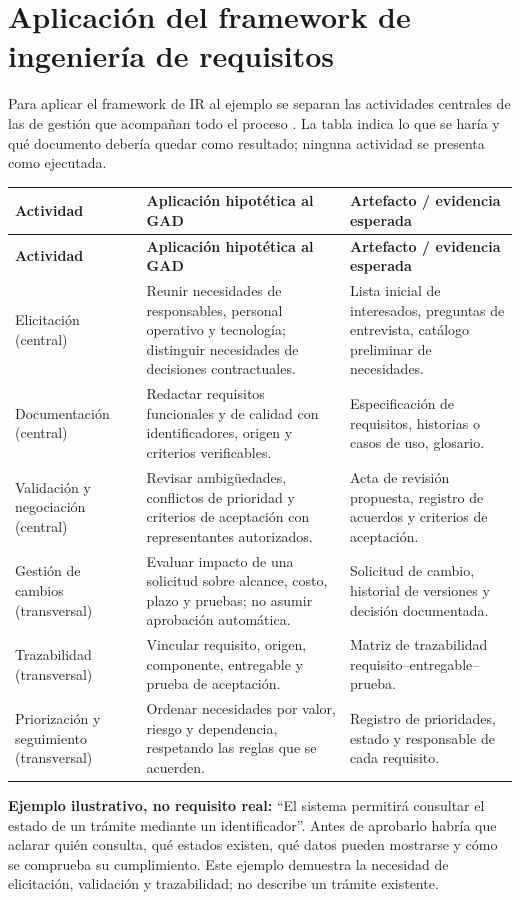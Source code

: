 \documentclass[10pt,a4paper,onecolumn]{IEEEtran}
\begin{document}
\section{Aplicación del framework de ingeniería de requisitos}
Para aplicar el framework de IR al ejemplo se separan las actividades centrales de las de gestión que acompañan todo el proceso \cite{ireb2026}. La tabla indica lo que se haría y qué documento debería quedar como resultado; ninguna actividad se presenta como ejecutada.
\small
\begin{longtable}{@{}p{3.0cm}p{6.25cm}p{5.65cm}@{}}
\toprule
\textbf{Actividad} & \textbf{Aplicación hipotética al GAD} & \textbf{Artefacto / evidencia esperada}\\
\midrule\endfirsthead
\toprule
\textbf{Actividad} & \textbf{Aplicación hipotética al GAD} & \textbf{Artefacto / evidencia esperada}\\
\midrule\endhead
Elicitación (central) & Reunir necesidades de responsables, personal operativo y tecnología; distinguir necesidades de decisiones contractuales. & Lista inicial de interesados, preguntas de entrevista, catálogo preliminar de necesidades.\\
\midrule
Documentación (central) & Redactar requisitos funcionales y de calidad con identificadores, origen y criterios verificables. & Especificación de requisitos, historias o casos de uso, glosario.\\
\midrule
Validación y negociación (central) & Revisar ambigüedades, conflictos de prioridad y criterios de aceptación con representantes autorizados. & Acta de revisión propuesta, registro de acuerdos y criterios de aceptación.\\
\midrule
Gestión de cambios (transversal) & Evaluar impacto de una solicitud sobre alcance, costo, plazo y pruebas; no asumir aprobación automática. & Solicitud de cambio, historial de versiones y decisión documentada.\\
\midrule
Trazabilidad (transversal) & Vincular requisito, origen, componente, entregable y prueba de aceptación. & Matriz de trazabilidad requisito--entregable--prueba.\\
\midrule
Priorización y seguimiento (transversal) & Ordenar necesidades por valor, riesgo y dependencia, respetando las reglas que se acuerden. & Registro de prioridades, estado y responsable de cada requisito.\\
\midrule
\end{longtable}
\normalsize
\textbf{Ejemplo ilustrativo, no requisito real:} ``El sistema permitirá consultar el estado de un trámite mediante un identificador''. Antes de aprobarlo habría que aclarar quién consulta, qué estados existen, qué datos pueden mostrarse y cómo se comprueba su cumplimiento. Este ejemplo demuestra la necesidad de elicitación, validación y trazabilidad; no describe un trámite existente.
\end{document}
